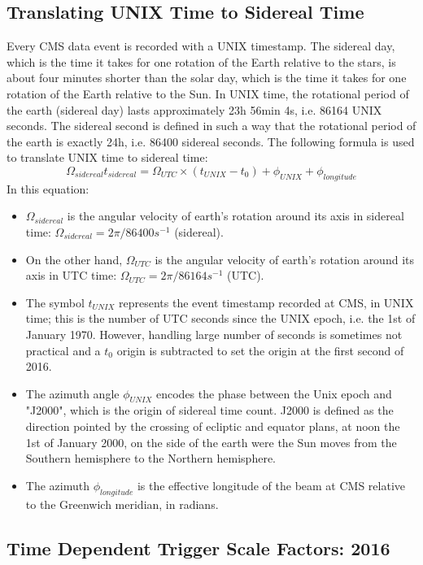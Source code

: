 \subsection{Translating UNIX Time to Sidereal Time}
Every CMS data event is recorded with a UNIX timestamp. 
The sidereal day, which is the time it takes for one rotation of the Earth relative to the stars, is about four minutes shorter than the solar day, which is the time it takes for one rotation of the Earth relative to the Sun.
In UNIX time, the rotational period of the earth (sidereal day) lasts approximately 23h 56min 4s, i.e. 86164 UNIX seconds. 
The sidereal second is defined in such a way that the rotational period of the earth is exactly 24h, i.e. 86400 sidereal seconds.
The following formula is used to translate UNIX time to sidereal time:
\begin{equation}
\Omega_{sidereal} t_{sidereal} = \Omega_{UTC} \times (t_{UNIX} - t_0) + \phi_{UNIX} + \phi_{longitude}
\end{equation}
In this equation:
\begin{itemize}
\item $\Omega_{sidereal}$ is the angular velocity of earth's rotation around its axis in sidereal time: $\Omega_{sidereal} = 2\pi / 86400 s^{-1}$ (sidereal). 
\item On the other hand, $\Omega_{UTC}$ is the angular velocity of earth's rotation around its axis in UTC time: $\Omega_{UTC} = 2\pi / 86164 s^{-1}$ (UTC). 
\item The symbol $t_{UNIX}$ represents the event timestamp recorded at CMS, in UNIX time; this is the number of UTC seconds since the UNIX epoch, i.e. the 1st of January 1970. However, handling large number of seconds is sometimes not practical and a $t_0$ origin is subtracted to set the origin at the first second of 2016.
\item The azimuth angle $\phi_{UNIX}$ encodes the phase between the Unix epoch and "J2000", which is the origin of sidereal time count. J2000 is defined as the direction pointed by the crossing of ecliptic and equator plans, at noon the 1st of January 2000, on the side of the earth were the Sun moves from the Southern hemisphere to the Northern hemisphere. 
\item The azimuth $\phi_{longitude}$ is the effective longitude of the beam at CMS relative to the Greenwich meridian, in radians.
\end{itemize}

\clearpage
\newpage
\subsection{Time Dependent Trigger Scale Factors: 2016}
\label{TrigSFResults_SideReal_2016}

